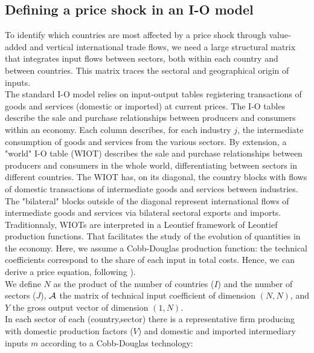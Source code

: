 \documentclass[12pt,a4paper]{paper}
\begin{document}
\subsection{Defining a price shock in an I-O model}\label{subsec:ioprice}
To identify which countries are most affected by a price shock through value-added and vertical international trade flows, we need a large structural matrix that integrates input flows between sectors, both within each country and between countries.
This matrix traces the sectoral and geographical origin of inputs. \\
The standard I-O model relies on input-output tables registering transactions of goods and services (domestic or imported) at current prices. The I-O tables describe the sale and purchase relationships between producers and consumers within an economy. Each column describes, for each industry $j$, the intermediate consumption of goods and services from the various sectors.
By extension, a "world" I-O table (WIOT) describes the sale and purchase relationships between producers and consumers in the whole world, differentiating between sectors in different countries.
The WIOT has, on its diagonal, the country blocks with flows of domestic transactions of intermediate goods and services between industries.
The "bilateral" blocks outside of the diagonal represent international flows of intermediate goods and services via bilateral sectoral exports and imports. \\
Traditionnaly, WIOTs are interpreted in a Leontief framework of Leontief production functions. That facilitates the study of the evolution of quantities in the economy. 
Here, we assume a Cobb-Douglas production function: the technical coefficients correspond to the share of each input in total costs. 
Hence, we can derive a price equation, following \citep{DeSoyres2018}).\\
We define $N$ as the product of the number of countries ($I$) and the number of sectors ($J$), $\cal A$ the matrix of technical input coefficient of dimension $(N, N)$, and $Y$ the gross output vector of dimension $(1, N)$. \\
In each sector of each (country,sector) there is a representative firm producing with domestic production factors ($V$) and domestic and imported intermediary inputs $m$ according to a Cobb-Douglas technology:
\end{document}
